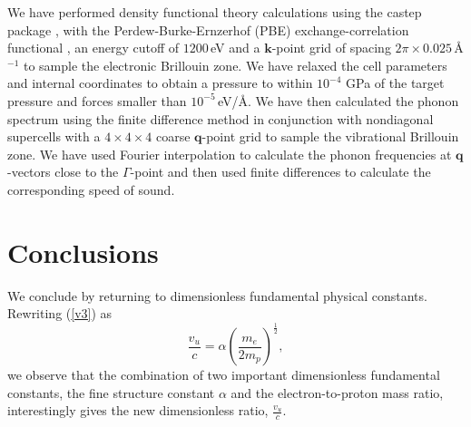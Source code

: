 \documentclass[aps,prl,groupedaddress,fleqn,twocolumn,10pt]{revtex4}
\begin{document}
We have performed density functional theory calculations using the {\sc castep} package \cite{castep}, with the Perdew-Burke-Ernzerhof (PBE) exchange-correlation functional \cite{pbe}, an energy cutoff of $1200$\,eV and a $\mathbf{k}$-point grid of spacing $2\pi\times0.025$\,\AA$^{-1}$ to sample the electronic Brillouin zone. We have relaxed the cell parameters and internal coordinates to obtain a pressure to within $10^{-4}$ GPa of the target pressure and forces smaller than $10^{-5}$\,eV/\AA. We have then calculated the phonon spectrum using the finite difference method \cite{fd_martin} in conjunction with nondiagonal supercells \cite{nondiagonal} with a $4\times4\times4$ coarse $\mathbf{q}$-point grid to sample the vibrational Brillouin zone. We have used Fourier interpolation to calculate the phonon frequencies at $\mathbf{q}$-vectors close to the $\Gamma$-point and then used finite differences to calculate the corresponding speed of sound.

\section{Conclusions}

We conclude by returning to dimensionless fundamental physical constants. Rewriting (\ref{v3}) as
\begin{equation}
\frac{v_u}{c}=\alpha\left(\frac{m_e}{2m_p}\right)^{\frac{1}{2}},
\label{v4}
\end{equation}
\noindent we observe that the combination of two important dimensionless fundamental constants, the fine structure constant $\alpha$ and the electron-to-proton mass ratio, interestingly gives the new dimensionless ratio, $\frac{v_u}c$.
\end{document}
